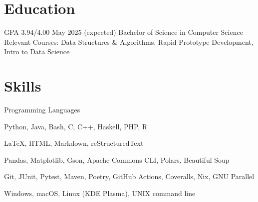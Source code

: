 \section{Education}
\begin{doutline}
     GPA 3.94/4.00
    \hfill May 2025 (expected)
        \2 Bachelor of Science in Computer Science
        \2 Relevant Courses: Data Structures \& Algorithms, Rapid Prototype Development, Intro to Data Science
\end{doutline}

\section{Skills}
\begin{labeling}{Programming Languages}
    \item [Programming Languages] Python, Java, Bash, C, C++, Haskell, PHP, R
    \item [Markup Languages] \LaTeX, HTML, Markdown, reStructuredText
    \item [Libraries] Pandas, Matplotlib, Gson, Apache Commons CLI, Polars, Beautiful Soup
    \item [Tools] Git, JUnit, Pytest, Maven, Poetry, GitHub Actions, Coveralls, Nix, GNU Parallel
    \item [Operating Systems] Windows, macOS, Linux (KDE Plasma), UNIX command line
\end{labeling}

